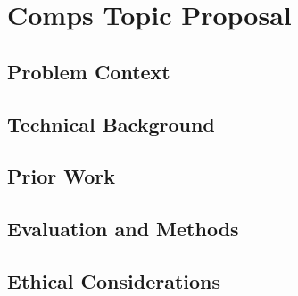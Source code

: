 \documentclass[10pt,twocolumn]{article}
\begin{document}
\section{Comps Topic Proposal}

\subsection{Problem Context}

\subsection{Technical Background}

\subsection{Prior Work}	

\subsection{Evaluation and Methods}

\subsection{Ethical Considerations}



\printbibliography
\end{document}
